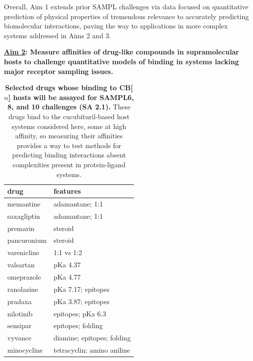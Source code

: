 \documentclass[11pt]{article}
\begin{document}
Overall, Aim 1 extends prior SAMPL challenges via data focused on quantitative prediction of physical properties of tremendous relevance to accurately predicting biomolecular interactions, paving the way to applications in more complex systems addressed in Aims 2 and 3.

\textbf{\underline{Aim 2}: Measure affinities of drug-like compounds in supramolecular hosts to challenge quantitative models of binding in systems lacking major receptor sampling issues.}

\begin{table}
\footnotesize
\begin{tabular}{l | l}
{\bf drug} & {\bf features} \\
\hline
memantine & adamantane; 1:1 \\
saxagliptin & adamantane; 1:1 \\
premarin & steroid \\
pancuronium & steroid\\
varenicline & 1:1 vs 1:2 \\
valsartan & pKa 4.37 \\ 
omeprazole & pKa 4.77 \\
ranolazine & pKa 7.17; epitopes \\
pradaxa & pKa 3.87; epitopes \\
nilotinib & epitopes; pKa 6.3 \\
sensipar & epitopes; folding \\
vyvance & diamine; epitopes; folding \\
minocycline & tetracyclin; amino aniline \\
\end{tabular}
\caption{\label{table:CB} {\bf Selected drugs whose binding to CB[$n$] hosts will be assayed for SAMPL6, 8, and 10 challenges (SA 2.1).} These drugs bind to the cucubituril-based host systems considered here, some at high affinity, so measuring their affinities provides a way to test methods for predicting binding interactions absent complexities present in protein-ligand systems.
}
\end{table}
\end{document}
